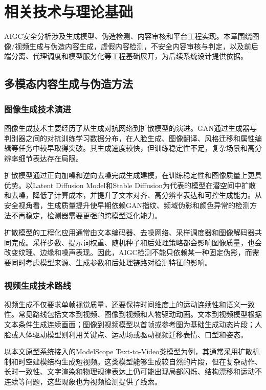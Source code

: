 
\chapter{相关技术与理论基础}

AIGC安全分析涉及生成模型、伪造检测、内容审核和平台工程实现。本章围绕图像/视频生成与伪造内容生成，虚假内容检测，不安全内容审核与判定，以及前后端分离、代理调度和模型服务化等工程基础展开，为后续系统设计提供依据。

\section{多模态内容生成与伪造方法}

\subsection{图像生成技术演进}

图像生成技术主要经历了从生成对抗网络到扩散模型的演进。GAN通过生成器与判别器之间的对抗训练学习数据分布，在人脸生成、图像翻译、风格迁移和属性编辑等任务中较早取得突破\cite{ref1,ref2,ref3}。其生成速度较快，但训练稳定性不足，复杂场景和高分辨率细节表达存在局限。

扩散模型通过正向加噪和逆向去噪完成生成建模，在训练稳定性和图像质量上更具优势\cite{ref4,ref5}。以Latent Diffusion Model和Stable Diffusion为代表的模型在潜空间中扩散和去噪，降低了计算成本，并提升了文本对齐、高分辨率表达和可控生成能力\cite{ref6,ref7,ref19}。从安全视角看，生成质量提升使早期依赖GAN指纹、频域伪影和颜色异常的检测方法不再稳定，检测器需要更强的跨模型泛化能力。

扩散模型的工程化应用通常由文本编码器、去噪网络、采样调度器和图像解码器共同完成。采样步数、提示词权重、随机种子和后处理策略都会影响图像质量，也会改变纹理、边缘和噪声表现。因此，AIGC检测不能只依赖某一种固定伪影，而需要同时考虑模型来源、生成参数和后处理链路对检测特征的影响。

\subsection{视频生成技术路线}

视频生成不仅要求单帧视觉质量，还要保持时间维度上的运动连续性和语义一致性。常见路线包括文本到视频、图像到视频和人物驱动动画。文本到视频模型根据文本条件生成连续画面；图像到视频模型以首帧或参考图为基础生成动态片段；人脸或人体驱动模型则利用关键点、运动场或驱动视频迁移表情、口型和姿态。

以本文原型系统接入的ModelScope Text-to-Video类模型为例，其通常采用扩散机制和时空建模结构生成短视频\cite{ref20}。这类模型能够生成较自然的片段，但在复杂动作、长时一致性、文字渲染和物理规律表达上仍可能出现局部闪烁、结构漂移和运动不连续等问题，这些现象也为视频检测提供了线索。

